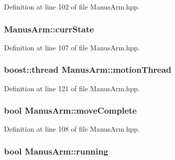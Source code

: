 \-Definition at line 102 of file \-Manus\-Arm.\-hpp.

\subsubsection[{curr\-State}]{ {\bf \-Manus\-Arm\-::curr\-State}\hspace{0.3cm}{\ttfamily  [private]}}\label{classManusArm_a9af73ad8208aaed94c4319081efeadb0}


\-Definition at line 107 of file \-Manus\-Arm.\-hpp.

\subsubsection[{motion\-Thread}]{\setlength{\rightskip}{0pt plus 5cm}boost\-::thread {\bf \-Manus\-Arm\-::motion\-Thread}\hspace{0.3cm}{\ttfamily  [private]}}\label{classManusArm_a5de1755d7b642cba75ac858610f62915}


\-Definition at line 121 of file \-Manus\-Arm.\-hpp.

\subsubsection[{move\-Complete}]{\setlength{\rightskip}{0pt plus 5cm}bool {\bf \-Manus\-Arm\-::move\-Complete}\hspace{0.3cm}{\ttfamily  [private]}}\label{classManusArm_ae7596bcc4efbf188e2999e9488a60043}


\-Definition at line 108 of file \-Manus\-Arm.\-hpp.

\subsubsection[{running}]{\setlength{\rightskip}{0pt plus 5cm}bool {\bf \-Manus\-Arm\-::running}\hspace{0.3cm}{\ttfamily  [private]}}\label{classManusArm_ae75dc5af7c9c1e60bed18699f0e5bf4e}


